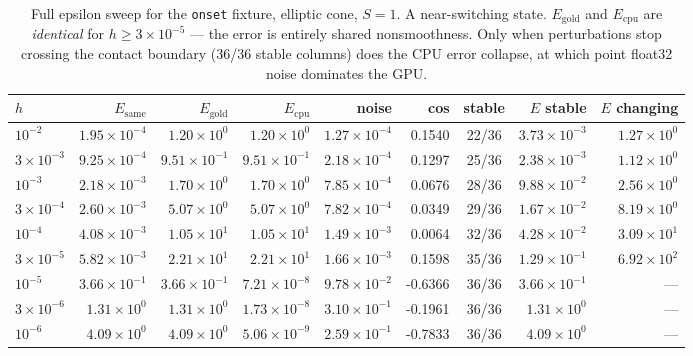\documentclass[11pt,a4paper]{article}
\newcommand{\code}[1]{\texttt{\small #1}}
\begin{document}
\begin{table}[htbp]
\centering
\footnotesize
\caption{Full epsilon sweep for the \code{onset} fixture, elliptic cone, $S=1$. A near-switching state. $E_{\mathrm{gold}}$ and $E_{\mathrm{cpu}}$ are \emph{identical} for $h\geq3\times10^{-5}$ --- the error is entirely shared nonsmoothness. Only when perturbations stop crossing the contact boundary (36/36 stable columns) does the CPU error collapse, at which point float32 noise dominates the GPU.}
\label{tab:sweeponset}
\begin{tabular}{lrrrrrcrr}
\toprule
$h$ & $E_{\mathrm{same}}$ & $E_{\mathrm{gold}}$ & $E_{\mathrm{cpu}}$ & \textbf{noise} & \textbf{cos} & \textbf{stable} & $E$\textbf{ stable} & $E$\textbf{ changing} \\
\midrule
$10^{-2}$ & $1.95\times10^{-4}$ & $1.20\times10^{0}$ & $1.20\times10^{0}$ & $1.27\times10^{-4}$ & 0.1540 & 22/36 & $3.73\times10^{-3}$ & $1.27\times10^{0}$ \\
$3\times10^{-3}$ & $9.25\times10^{-4}$ & $9.51\times10^{-1}$ & $9.51\times10^{-1}$ & $2.18\times10^{-4}$ & 0.1297 & 25/36 & $2.38\times10^{-3}$ & $1.12\times10^{0}$ \\
$10^{-3}$ & $2.18\times10^{-3}$ & $1.70\times10^{0}$ & $1.70\times10^{0}$ & $7.85\times10^{-4}$ & 0.0676 & 28/36 & $9.88\times10^{-2}$ & $2.56\times10^{0}$ \\
$3\times10^{-4}$ & $2.60\times10^{-3}$ & $5.07\times10^{0}$ & $5.07\times10^{0}$ & $7.82\times10^{-4}$ & 0.0349 & 29/36 & $1.67\times10^{-2}$ & $8.19\times10^{0}$ \\
$10^{-4}$ & $4.08\times10^{-3}$ & $1.05\times10^{1}$ & $1.05\times10^{1}$ & $1.49\times10^{-3}$ & 0.0064 & 32/36 & $4.28\times10^{-2}$ & $3.09\times10^{1}$ \\
$3\times10^{-5}$ & $5.82\times10^{-3}$ & $2.21\times10^{1}$ & $2.21\times10^{1}$ & $1.66\times10^{-3}$ & 0.1598 & 35/36 & $1.29\times10^{-1}$ & $6.92\times10^{2}$ \\
$10^{-5}$ & $3.66\times10^{-1}$ & $3.66\times10^{-1}$ & $7.21\times10^{-8}$ & $9.78\times10^{-2}$ & -0.6366 & 36/36 & $3.66\times10^{-1}$ & --- \\
$3\times10^{-6}$ & $1.31\times10^{0}$ & $1.31\times10^{0}$ & $1.73\times10^{-8}$ & $3.10\times10^{-1}$ & -0.1961 & 36/36 & $1.31\times10^{0}$ & --- \\
$10^{-6}$ & $4.09\times10^{0}$ & $4.09\times10^{0}$ & $5.06\times10^{-9}$ & $2.59\times10^{-1}$ & -0.7833 & 36/36 & $4.09\times10^{0}$ & --- \\
\bottomrule
\end{tabular}
\end{table}
\end{document}
